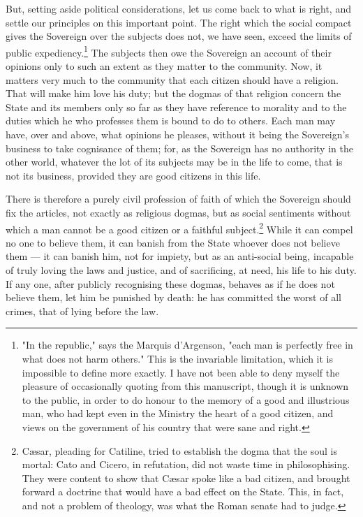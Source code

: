 \documentclass[12pt]{report}
\begin{document}
But, setting aside political considerations, let us come back to what is right, and settle our principles on this important point. The right which the social compact gives the Sovereign over the subjects does not, we have seen, exceed the limits of public expediency.\footnote{"In the republic," says the Marquis d'Argenson, "each man is perfectly free in what does not harm others." This is the invariable limitation, which it is impossible to define more exactly. I have not been able to deny myself the pleasure of occasionally quoting from this manuscript, though it is unknown to the public, in order to do honour to the memory of a good and illustrious man, who had kept even in the Ministry the heart of a good citizen, and views on the government of his country that were sane and right.} The subjects then owe the Sovereign an account of their opinions only to such an extent as they matter to the community. Now, it matters very much to the community that each citizen should have a religion. That will make him love his duty; but the dogmas of that religion concern the State and its members only so far as they have reference to morality and to the duties which he who professes them is bound to do to others. Each man may have, over and above, what opinions he pleases, without it being the Sovereign's business to take cognisance of them; for, as the Sovereign has no authority in the other world, whatever the lot of its subjects may be in the life to come, that is not its business, provided they are good citizens in this life.

There is therefore a purely civil profession of faith of which the Sovereign should fix the articles, not exactly as religious dogmas, but as social sentiments without which a man cannot be a good citizen or a faithful subject.\footnote{Cæsar, pleading for Catiline, tried to establish the dogma that the soul is mortal: Cato and Cicero, in refutation, did not waste time in philosophising. They were content to show that Cæsar spoke like a bad citizen, and brought forward a doctrine that would have a bad effect on the State. This, in fact, and not a problem of theology, was what the Roman senate had to judge.} While it can compel no one to believe them, it can banish from the State whoever does not believe them — it can banish him, not for impiety, but as an anti-social being, incapable of truly loving the laws and justice, and of sacrificing, at need, his life to his duty. If any one, after publicly recognising these dogmas, behaves as if he does not believe them, let him be punished by death: he has committed the worst of all crimes, that of lying before the law.
\end{document}

